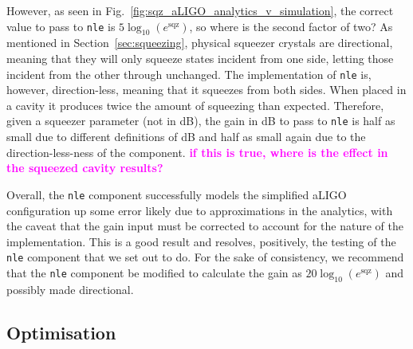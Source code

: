 \documentclass[aps,pra,superscriptaddress,reprint,nofootinbib]{revtex4-1}
\newcommand{\code}[1]{\texttt{#1}}
\newcommand{\jam}[1]{\textcolor{magenta}{\textbf{#1}}}
\begin{document}
However, as seen in Fig.~\ref{fig:sqz_aLIGO_analytics_v_simulation}, the correct value to pass to \code{nle} is $5 \log_{10}(e^\mathrm{sqz})$, so where is the second factor of two? As mentioned in Section~\ref{sec:squeezing}, physical squeezer crystals are directional, meaning that they will only squeeze states incident from one side, letting those incident from the other through unchanged. The implementation of \code{nle} is, however, direction-less, meaning that it squeezes from both sides. When placed in a cavity it produces twice the amount of squeezing than expected. Therefore, given a squeezer parameter (not in dB), the gain in dB to pass to \code{nle} is half as small due to different definitions of dB and half as small again due to the direction-less-ness of the component. \jam{if this is true, where is the effect in the squeezed cavity results?}


Overall, the \code{nle} component successfully models the simplified aLIGO configuration up some error likely due to approximations in the analytics, with the caveat that the gain input must be corrected to account for the nature of the implementation. This is a good result and resolves, positively, the testing of the \code{nle} component that we set out to do. For the sake of consistency, we recommend that the \code{nle} component be modified to calculate the gain as $20 \log_{10}(e^\mathrm{sqz})$ and possibly made directional.


\subsection{Optimisation}
\end{document}
